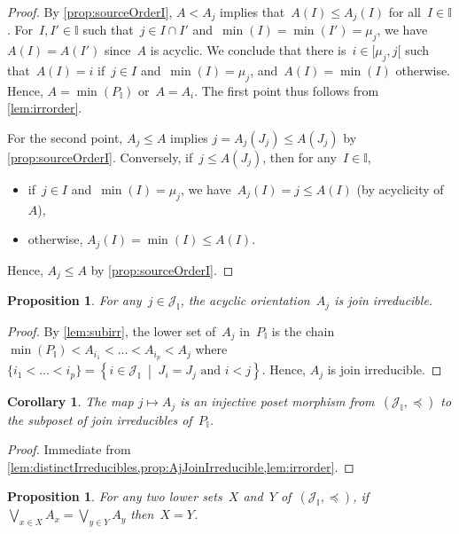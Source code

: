 \documentclass[reqno]{amsart}
\newtheorem{corollary}[theorem]{Corollary}
\newtheorem{proposition}[theorem]{Proposition}
\theoremstyle{definition}
\newcommand{\cal}[1]{\mathcal{#1}} %
\newcommand{\set}[2]{\left\{ #1 \;\middle|\; #2 \right\}} %
\newcommand{\bigJoin}{\bigvee} %
\newcommand{\II}{\mathbb I} %
\newcommand{\cJ}{\cal{J}} %
\begin{document}
\begin{proof}
By \cref{prop:sourceOrderI}, $A < A_j$ implies that~$A(I) \le A_j(I)$ for all~$I \in \II$.
For~$I, I' \in \II$ such that~$j \in I \cap I'$ and~$\min(I) = \min(I') = \mu_j$, we have~$A(I) = A(I')$ since~$A$ is acyclic.
We conclude that there is~$i \in {[\mu_j, j[}$ such that~$A(I) = i$ if~$j \in I$ and~$\min(I) = \mu_j$, and~$A(I) = \min(I)$ otherwise.
Hence, $A = \min(P_\II)$ or~$A = A_i$.
The first point thus follows from \cref{lem:irrorder}.

For the second point, $A_j \le A$ implies $j = A_j(J_j) \le A(J_j)$ by \cref{prop:sourceOrderI}.
Conversely, if~$j \le A(J_j)$, then for any~$I \in \II$,
\begin{itemize}
\item if~$j \in I$ and~$\min(I) = \mu_j$, we have~$A_j(I) = j \le A(I)$ (by acyclicity of~$A$),
\item otherwise, $A_j(I) = \min(I) \le A(I)$.
\end{itemize}
Hence, $A_j \le A$ by \cref{prop:sourceOrderI}.
\end{proof}

\begin{proposition}
\label{prop:AjJoinIrreducible}
For any~$j\in \cJ_\II$, the acyclic orientation~$A_j$ is join irreducible.
\end{proposition}

\begin{proof}
By \cref{lem:subirr}, the lower set of~$A_j$ in~$P_\II$ is the chain $\min(P_\II) < A_{i_1} < \dots < A_{i_p} < A_j$ where~$\{i_1 < \dots < i_p\} = \set{i \in \cJ_\II}{J_i = J_j \text{ and } i < j}$.
Hence, $A_j$ is join irreducible.
\end{proof}

\begin{corollary}
\label{coro:irreduciblePosetMorphism}
The map $j \mapsto A_j$ is an injective poset morphism from~$(\cJ_\II, \preccurlyeq)$ to the subposet of join irreducibles of~$P_\II$.
\end{corollary}

\begin{proof}
Immediate from \cref{lem:distinctIrreducibles,prop:AjJoinIrreducible,lem:irrorder}.
\end{proof}

\begin{proposition}
\label{prop:injectivityDistributive}
For any two lower sets~$X$ and~$Y$ of~$(\cJ_\II, \preccurlyeq)$, if~$\bigJoin\limits_{x \in X} A_x = \bigJoin\limits_{y \in Y} A_y$ then~$X = Y$.
\end{proposition}
\end{document}
